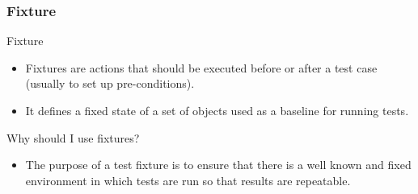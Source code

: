 \begin{frame}[parent={concept:junit}, hasprev=false, hasnext=false]
\frametitle{Fixture}
\label{concept:junit-fixture}
\label{concept:fixture}

\begin{block:concept}{Fixture}
\begin{itemize}
	\item Fixtures are actions that should be executed before or after a test
	case (usually to set up pre-conditions).

	\item It defines a fixed state of a set of objects used as a baseline for
	running tests.
\end{itemize}
\end{block:concept}

\begin{block:fact}{Why should I use fixtures?}
\begin{itemize}
	\item The purpose of a test fixture is to ensure that there is a well known
	and fixed environment in which tests are run so that results are
	repeatable.
\end{itemize}
\end{block:fact}
\end{frame}